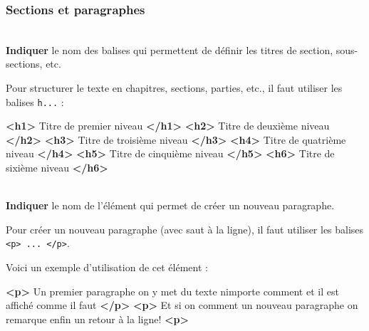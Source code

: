 \documentclass[a4paper,17pt]{extarticle}
\newenvironment{eleve}%
{\begin{activite}\color{noiramu}\\}
{\end{activite}}
\newenvironment{Shaded}{}{}
\newcommand{\KeywordTok}[1]{\textcolor[rgb]{0.00,0.44,0.13}{\textbf{{#1}}}}
\newcommand{\NormalTok}[1]{{#1}}
\begin{document}
    \hypertarget{sections-et-paragraphes}{%
\subsubsection{Sections et paragraphes}\label{sections-et-paragraphes}}
\begin{eleve}
    \textbf{Indiquer} le nom des balises qui permettent de définir les
titres de section, sous-sections, etc.
        
        \end{eleve}\begin{reponse}
    Pour structurer le texte en chapitres, sections, parties, etc., il faut
utiliser les balises \texttt{h...} :

\begin{Shaded}
\begin{Highlighting}[]
\KeywordTok{\textless{}h1\textgreater{}}\NormalTok{ Titre de premier niveau }\KeywordTok{\textless{}/h1\textgreater{}}
\KeywordTok{\textless{}h2\textgreater{}}\NormalTok{ Titre de deuxième niveau }\KeywordTok{\textless{}/h2\textgreater{}}
\KeywordTok{\textless{}h3\textgreater{}}\NormalTok{ Titre de troisième niveau }\KeywordTok{\textless{}/h3\textgreater{}}
\KeywordTok{\textless{}h4\textgreater{}}\NormalTok{ Titre de quatrième niveau }\KeywordTok{\textless{}/h4\textgreater{}}
\KeywordTok{\textless{}h5\textgreater{}}\NormalTok{ Titre de cinquième niveau }\KeywordTok{\textless{}/h5\textgreater{}}
\KeywordTok{\textless{}h6\textgreater{}}\NormalTok{ Titre de sixième niveau }\KeywordTok{\textless{}/h6\textgreater{}}
\end{Highlighting}
\end{Shaded}

            \end{reponse}\begin{eleve}
    \textbf{Indiquer} le nom de l'élément qui permet de créer un nouveau
paragraphe.
        
        \end{eleve}\begin{reponse}
    Pour créer un nouveau paragraphe (avec saut à la ligne), il faut
utiliser les balises
\texttt{\textless{}p\textgreater{}\ ...\ \textless{}/p\textgreater{}}.

Voici un exemple d'utilisation de cet élément :

\begin{Shaded}
\begin{Highlighting}[]
\KeywordTok{\textless{}p\textgreater{}}\NormalTok{ Un premier paragraphe}
\NormalTok{    on y met}
\NormalTok{    du texte   n\textquotesingle{}importe comment}
\NormalTok{    et il est affiché comme}
\NormalTok{    il }
\NormalTok{    faut }\KeywordTok{\textless{}/p\textgreater{}}
\KeywordTok{\textless{}p\textgreater{}}\NormalTok{ Et si on comment un nouveau paragraphe}
\NormalTok{    on remarque enfin un retour à la ligne! }\KeywordTok{\textless{}p\textgreater{}}
\end{Highlighting}
\end{Shaded}

            \end{reponse}
\end{document}
